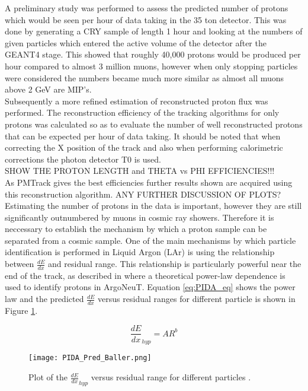 \documentclass[11pt]{report} %
\begin{document}
{A preliminary study was performed to assess the predicted number of protons which would be seen per hour of data taking in the 35 ton detector. This was done by generating a CRY sample of length 1 hour and looking at the numbers of given particles which entered the active volume of the detector after the GEANT4 stage. This showed that roughly 40,000 protons would be produced per hour compared to almost 3 million muons, however when only stopping particles were considered the numbers became much more similar as almost all muons above 2 GeV are MIP's. \\

Subsequently a more refined estimation of reconstructed proton flux was performed. The reconstruction efficiency of the tracking algorithms for only protons was calculated so as to evaluate the number of well reconstructed protons that can be expected per hour of data taking. It should be noted that when correcting the X position of the track and also when performing calorimetric corrections the photon detector T0 is used. \\

SHOW THE PROTON LENGTH and THETA vs PHI EFFICIENCIES!!! \\

As PMTrack gives the best efficiencies further results shown are acquired using this reconstruction algorithm. ANY FURTHER DISCUSSION OF PLOTS? \\

Estimating the number of protons in the data is important, however they are still significantly outnumbered by muons in cosmic ray showers. Therefore it is neccessary to establish the mechanism by which a proton sample can be separated from a cosmic sample. One of the main mechanisms by which particle identification is performed in Liquid Argon (LAr) is using the relationship between $\frac{dE}{dx}$ and residual range. This relationship is particularly powerful near the end of the track, as described in \cite{PIDA} where a theoretical power-law dependence is used to identify protons in ArgoNeuT. Equation \ref{eq:PIDA_eq} shows the power law and the predicted $\frac{dE}{dx}$ versus residual ranges for different particle is shown in Figure \ref{fig:PIDA_Baller_MC}.

\begin{equation}
  \label{eq:PIDA_eq}
  \frac{dE}{dx}_{hyp} = A R^b 
\end{equation}

\begin{figure}[h]
  \centering
  \texttt{[image: PIDA\_Pred\_Baller.png]}
  \caption{Plot of the $\frac{dE}{dx}_{hyp}$ versus residual range for different particles \cite{PIDA}.}
  \label{fig:PIDA_Baller_MC}
\end{figure}

}
\end{document}
